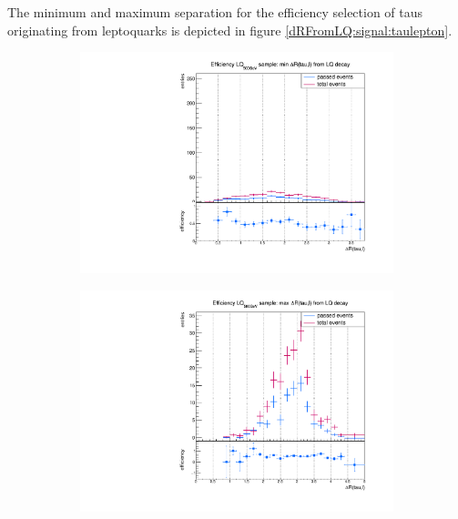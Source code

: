 %
The minimum and maximum separation for the efficiency selection of taus originating from leptoquarks is depicted in figure \ref{dRFromLQ:signal:taulepton}.\newline
%
\begin{figure}
  \centering
                \begin{subfigure}[t]{0.49\textwidth}
                \includegraphics[width=\textwidth]{figures/plots/LQ75/Divided_fromLQ_mindR_taulepton.pdf}
                \label{dRFromLQ:signal:taulepton:minLQ75}
                \end{subfigure}
                \begin{subfigure}[t]{0.49\textwidth}
                \includegraphics[width=\textwidth]{figures/plots/LQ75/Divided_maxdR_fromLQ_taulepton.pdf}

\end{subfigure}
\end{figure}
